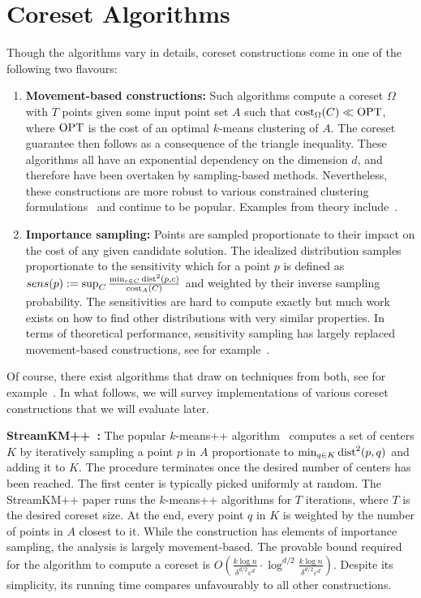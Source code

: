 \section{Coreset Algorithms}
\label{sec:algorithms}

Though the algorithms vary in details, coreset constructions come in one of the following two flavours:

\begin{enumerate}
\item {\bf Movement-based constructions:} Such algorithms compute a coreset $\Omega$ with $T$ points given some input point set $A$ such that $\text{cost}_{\Omega}(C)\ll \text{OPT}$, where $\text{OPT}$ is the cost of an optimal $k$-means clustering of $A$. 
The coreset guarantee then follows as a consequence of the triangle inequality. These algorithms all have an exponential dependency on the dimension $d$, and therefore have been overtaken by sampling-based methods. Nevertheless, these constructions are more robust to various constrained clustering formulations~\cite{HuangJV19,SSS19} and continue to be popular. Examples from theory include~\cite{FrahlS2005,HaM04}. 

\item {\bf Importance sampling:} Points are sampled proportionate to their impact on the cost of any given candidate solution. The idealized distribution samples proportionate to the sensitivity which for a point $p$ is defined as $sens(p):=\sup_{C} \frac{\min_{c\in C} \text{dist}^2(p,c)}{\text{cost}_A(C)}$ and weighted by their inverse sampling probability. The sensitivities are hard to compute exactly but much work exists on how to find other distributions with very similar properties. In terms of theoretical performance, sensitivity sampling has largely replaced movement-based constructions, see for example~\cite{FeldmanL11,LangbergS10}.  
\end{enumerate}

Of course, there exist algorithms that draw on techniques from both, see for example~\cite{Cohen-AddadSS21}. In what follows, we will survey implementations of various coreset constructions that we will evaluate later.


{\bf StreamKM++~\cite{AckermannMRSLS12}:} The popular $k$-means++ algorithm~\cite{ArV07} computes a set of centers $K$ by iteratively sampling a point $p$ in $A$ proportionate to $\min_{q\in K} \text{dist}^2(p,q)$ and adding it to $K$. The procedure terminates once the desired number of centers has been reached. The first center is typically picked uniformly at random.
The StreamKM++ paper runs the $k$-means++ algorithms for $T$ iterations, where $T$ is the desired coreset size. At the end, every point $q$ in $K$ is weighted by the number of points in $A$ closest to it. While the construction has elements of importance sampling, the analysis is largely movement-based. The provable bound required for the algorithm to compute a coreset is $O\left(\frac{k\log n}{\delta^{d/2}\varepsilon^d}\cdot \log^{d/2} \frac{k\log n}{\delta^{d/2}\varepsilon^d}\right)$. Despite its simplicity, its running time compares unfavourably to all other constructions.

